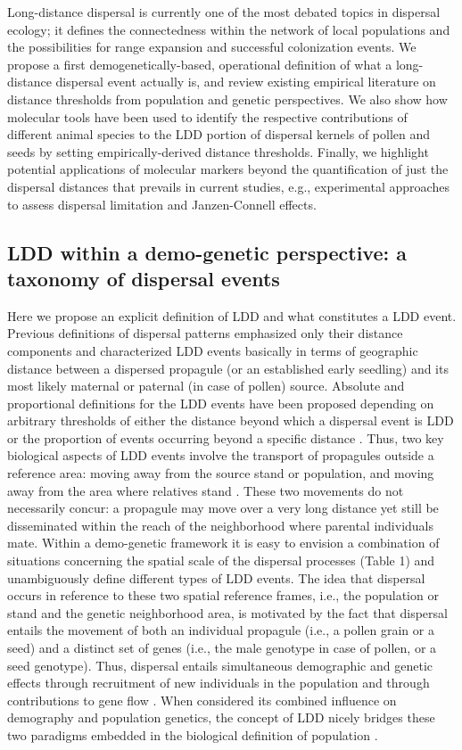 \documentclass[a4paper, 12pt]{article}
\begin{document}
\begin{linenumbers}
Long-distance dispersal is currently one of the most debated topics in dispersal ecology; it defines the connectedness within the network of local populations and the possibilities for range expansion and successful colonization events. We propose a first demogenetically-based, operational definition of what a long-distance dispersal event actually is, and review existing empirical literature on distance thresholds from population and genetic perspectives. We also show how molecular tools have been used to identify the respective contributions of different animal species to the LDD portion of dispersal kernels of pollen and seeds by setting empirically-derived distance thresholds. Finally, we highlight potential applications of molecular markers beyond the quantification of just the dispersal distances that prevails in current studies, e.g., experimental approaches to assess dispersal limitation and Janzen-Connell effects.


\subsection*{LDD within a demo-genetic perspective: a taxonomy of dispersal events}

Here we propose an explicit definition of LDD and what constitutes a LDD event. Previous definitions of dispersal patterns emphasized only their distance components and characterized LDD events basically in terms of geographic distance between a dispersed propagule (or an established early seedling) and its most likely maternal or paternal (in case of pollen) source. Absolute and proportional definitions for the LDD events have been proposed depending on arbitrary thresholds of either the distance beyond which a dispersal event is LDD or the proportion of events occurring beyond a specific distance \citep{Nathan:2005jc, Nathan:2008is}. Thus, two key biological aspects of LDD events involve the transport of propagules outside a reference area: moving away from the source stand or population, and moving away from the area where relatives stand \citep{Kinlan:2005fb}. These two movements do not necessarily concur: a propagule may move over a very long distance yet still be disseminated within the reach of the neighborhood where parental individuals mate. Within a demo-genetic framework it is easy to envision a combination of situations concerning the spatial scale of the dispersal processes (Table 1) and unambiguously define different types of LDD events. The idea that dispersal occurs in reference to these two spatial reference frames, i.e., the population or stand and the genetic neighborhood area, is motivated by the fact that dispersal entails the movement of both an individual propagule (i.e., a pollen grain or a seed) and a distinct set of genes (i.e., the male genotype in case of pollen, or a seed genotype). Thus, dispersal entails simultaneous demographic and genetic effects through recruitment of new individuals in the population and through contributions to gene flow \citep{Harper:1977aa}. When considered its combined influence on demography and population genetics, the concept of LDD nicely bridges these two paradigms embedded in the biological definition of population \citep{Waples:2006ev}. 
 

\end{linenumbers}
\end{document}
